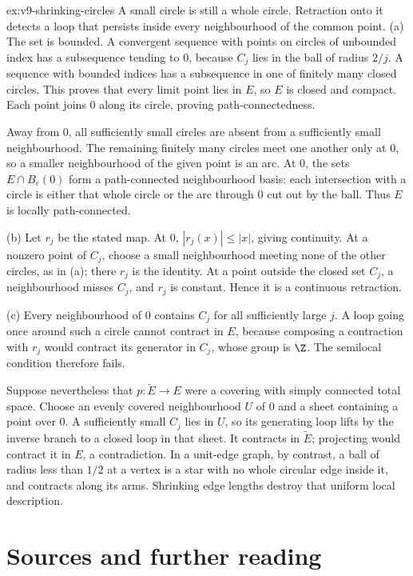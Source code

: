 \begin{solution}{ex:v9-shrinking-circles}
\idea A small circle is still a whole circle. Retraction onto it detects a loop that persists inside every neighbourhood of the common point.
\writeup (a) The set is bounded. A convergent sequence with points on circles of unbounded index has a subsequence tending to $0$, because $C_j$ lies in the ball of radius $2/j$. A sequence with bounded indices has a subsequence in one of finitely many closed circles. This proves that every limit point lies in $E$, so $E$ is closed and compact. Each point joins $0$ along its circle, proving path-connectedness.

Away from $0$, all sufficiently small circles are absent from a sufficiently small neighbourhood. The remaining finitely many circles meet one another only at $0$, so a smaller neighbourhood of the given point is an arc. At $0$, the sets $E\cap B_\varepsilon(0)$ form a path-connected neighbourhood basis: each intersection with a circle is either that whole circle or the arc through $0$ cut out by the ball. Thus $E$ is locally path-connected.

(b) Let $r_j$ be the stated map. At $0$, $|r_j(x)|\le|x|$, giving continuity. At a nonzero point of $C_j$, choose a small neighbourhood meeting none of the other circles, as in (a); there $r_j$ is the identity. At a point outside the closed set $C_j$, a neighbourhood misses $C_j$, and $r_j$ is constant. Hence it is a continuous retraction.

(c) Every neighbourhood of $0$ contains $C_j$ for all sufficiently large $j$. A loop going once around such a circle cannot contract in $E$, because composing a contraction with $r_j$ would contract its generator in $C_j$, whose group is $\Z$. The semilocal condition therefore fails.

Suppose nevertheless that $p:\tilde E\to E$ were a covering with simply connected total space. Choose an evenly covered neighbourhood $U$ of $0$ and a sheet containing a point over $0$. A sufficiently small $C_j$ lies in $U$, so its generating loop lifts by the inverse branch to a closed loop in that sheet. It contracts in $\tilde E$; projecting would contract it in $E$, a contradiction. In a unit-edge graph, by contrast, a ball of radius less than $1/2$ at a vertex is a star with no whole circular edge inside it, and contracts along its arms. Shrinking edge lengths destroy that uniform local description.
\end{solution}

\section*{Sources and further reading}

